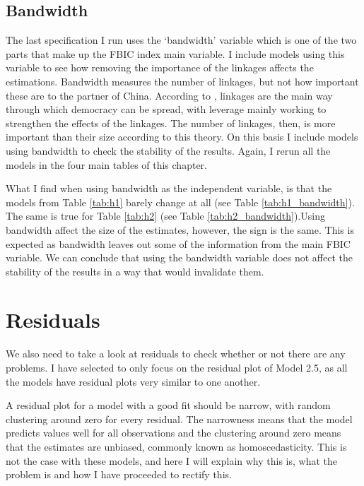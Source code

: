 \subsection{Bandwidth}
The last specification I run uses the `bandwidth' variable which is one of the two parts that make up the FBIC index main variable. I include models using this variable to see how removing the importance of the linkages affects the estimations. Bandwidth measures the number of linkages, but not how important these are to the partner of China. According to \citet{levitsky_linkage_2006}, linkages are the main way through which democracy can be spread, with leverage mainly working to strengthen the effects of the linkages. The number of linkages, then, is more important than their size according to this theory. On this basis I include models using bandwidth to check the stability of the results. Again, I rerun all the models in the four main tables of this chapter.

What I find when using bandwidth as the independent variable, is that the models from Table \ref{tab:h1} barely change at all (see Table \ref{tab:h1_bandwidth}). The same is true for Table \ref{tab:h2} (see Table \ref{tab:h2_bandwidth}).Using bandwidth affect the size of the estimates, however, the sign is the same. This is expected as bandwidth leaves out some of the information from the main FBIC variable. We can conclude that using the bandwidth variable does not affect the stability of the results in a way that would invalidate them. 

\section{Residuals}
We also need to take a look at residuals to check whether or not there are any problems. I have selected to only focus on the residual plot of Model 2.5, as all the models have residual plots very similar to one another.

A residual plot for a model with a good fit should be narrow, with random clustering around zero for every residual. The narrowness means that the model predicts values well for all observations and the clustering around zero means that the estimates are unbiased, commonly known as homoscedasticity. This is not the case with these models, and here I will explain why this is, what the problem is and how I have proceeded to rectify this.


